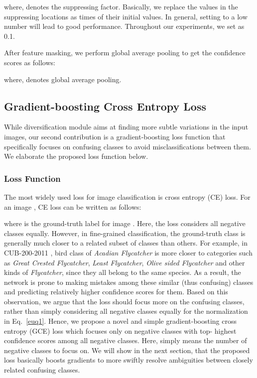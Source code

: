 \documentclass[letterpaper]{article} \usepackage{aaai20}  \usepackage{times}  \usepackage{helvet} \usepackage{courier}  \usepackage[hyphens]{url}  \usepackage{graphicx} \usepackage{multirow}
\begin{document}
where,  denotes the suppressing factor. Basically, we replace the values in the suppressing locations as  times of their initial values. In general, setting  to a low number will lead to good performance. Throughout our experiments, we set  as 0.1.

After feature masking, we perform global average pooling to get the confidence scores   as follows:

where,  denotes global average pooling.

\subsection{Gradient-boosting Cross Entropy Loss}\label{selected_loss}
While diversification module aims at finding more subtle variations in the input images, our second contribution is  a gradient-boosting loss function that specifically focuses on confusing classes to avoid misclassifications between them. We elaborate the proposed loss function below. 

\subsubsection{Loss Function}
The most widely used loss for image classification is cross entropy (CE) loss. For an image , CE loss can be written as follows:

where  is the ground-truth label for image . Here, the loss considers all negative classes equally. However, in fine-grained classification, the ground-truth class is generally much closer to a related subset of classes than others. For example, in CUB-200-2011 \cite{dataset_cub}, bird class of \emph{Acadian Flycatcher} is more closer to categories such as \emph{Great Crested Flycatcher}, \emph{Least Flycatcher}, \emph{Olive sided Flycatcher} and other kinds of \emph{Flycatcher}, since they all belong to the same species. As a result, the network is prone to making mistakes among these similar (thus confusing) classes and predicting relatively higher confidence scores for them. Based on this observation, we argue that the loss should focus more on the confusing classes, rather than simply considering all negative classes equally for the normalization in Eq.~\ref{euq1}. Hence, we propose a novel and simple gradient-boosting cross entropy (GCE) loss which focuses only on  negative classes with top- highest confidence scores among all negative classes. Here,  simply means the number of negative classes to focus on. We will show in the next section, that the proposed loss basically boosts gradients to more swiftly resolve ambiguities between closely related confusing classes.  
\end{document}
